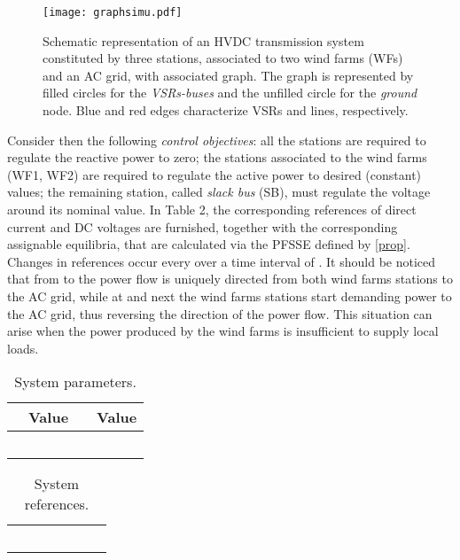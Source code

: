\documentclass[5p,twocolumn]{elsarticle}
\numberwithin{equation}{section}
\begin{document}
\begin{figure}[h!]
 \centering
\texttt{[image: graphsimu.pdf]}
\caption{{Schematic representation of an HVDC transmission system constituted by three stations, associated to two wind farms (WFs) and an AC grid, with associated graph. The graph is represented by filled circles for the \textit{VSRs-buses} and the unfilled circle for the \textit{ground} node. Blue and red edges characterize VSRs and lines, respectively.}}
 \label{tops}
\end{figure}


Consider then the following {\em control objectives}: all the stations are required to regulate the reactive power to zero; the stations associated to the wind farms (WF1, WF2) are required to regulate the active power to desired (constant) values; the remaining station, called \textit{slack bus} (SB), must regulate the voltage around its nominal value. In Table 2, the corresponding references of direct current and DC voltages are furnished, together with the corresponding assignable equilibria, that are calculated via the PFSSE defined by \eqref{prop}. Changes in references occur every   over a time interval of  . It should be noticed that from  to  the power flow is uniquely directed from both wind farms stations to the AC grid, while at   and next  the wind farms stations start demanding power to the AC grid, thus reversing the direction of the power flow. This situation can arise when the power produced by the wind farms is insufficient to supply local loads.
\begin{table}
\caption{System parameters.}
\label{parameters1}       \centering
\begin{tabular}{p{1cm}p{1.35cm}p{1cm}p{1.35cm}}
\hline
  & Value &   & Value \\
\hline
                &   &   &   \\
                        &    &  &   \\
                            &   &    &   \\
                    &   & & \\
                    &   & & \\
\hline 
\end{tabular}
\end{table}
\begin{table}
\caption{System references.}
\label{desired}       \begin{tabular}{p{0.3cm}p{0.8cm}p{0.8cm}p{0.8cm}p{0.7cm}p{1cm}p{1cm}}
\hline\noalign{\smallskip}
          &     &    &  & & &\\
\hline
           &     &  &   &  &   &  \\
         &     &   &  &  &   &   \\
        &     &   &  &  &  &   \\
        &     &   &  &  &  &   \\
        &     &   &  &  &  &   \\
\hline
\end{tabular}
\end{table}
\end{document}
